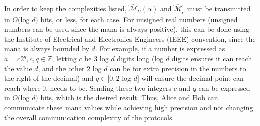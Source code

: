 \documentclass[../3Wworkreport.tex]{subfiles}
\begin{document}
In order to keep the complexities listed, $\hat{\mathcal{M}}_U(\alpha)$ and $\hat{\mathcal{M}}_\rho$ must be transmitted in $O($log $d)$ bits, or less, for each case. For unsigned real numbers (unsigned numbers can be used since the mana is always positive), this can be done using the Institute of Electrical and Electronics Engineers (IEEE) convention, since the mana is always bounded by $d$. For example, if a number is expressed as $a = c2^q, c,q \in \mathbb{Z}$, letting $c$ be 3 log $d$ digits long (log $d$ digits ensures it can reach the value $d$, and the other 2 log $d$ can be for extra precision in the numbers to the right of the decimal) and $q \in [0, 2$ log $d]$ will ensure the decimal point can reach where it needs to be. Sending these two integers $c$ and $q$ can be expressed in $O($log $d)$ bits, which is the desired result. Thus, Alice and Bob can communicate these mana values while achieving high precision and not changing the overall communication complexity of the protocols.
\end{document}
